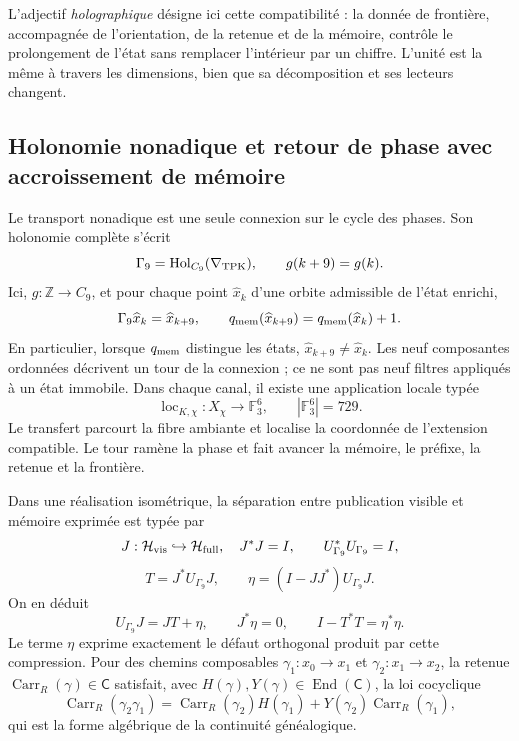 L'adjectif \emph{holographique} désigne ici cette compatibilité : la donnée de
frontière, accompagnée de l'orientation, de la retenue et de la mémoire, contrôle le
prolongement de l'état sans remplacer l'intérieur par un chiffre. L'unité est
la même à travers les dimensions, bien que sa décomposition et ses lecteurs
changent.

\subsection*{Holonomie nonadique et retour de phase avec accroissement de mémoire}

Le transport nonadique est une seule connexion sur le cycle des phases. Son
holonomie complète s'écrit
\begin{equation}\label{p12-83-c0-s1:eq:horizonte-conexion-nonadica}
 \Gamma_9=\operatorname{Hol}_{C_9}(\nabla_{\rm TPK}),
 \qquad g(k+9)=g(k).
\end{equation}
Ici, \(g:\mathbb Z\to C_9\), et pour chaque point
\(\widehat x_k\) d'une orbite admissible de l'état enrichi,
\[
 \Gamma_9\widehat x_k=\widehat x_{k+9},\qquad
 q_{\rm mem}(\widehat x_{k+9})
 =q_{\rm mem}(\widehat x_k)+1.
\]
En particulier, lorsque \(q_{\rm mem}\) distingue les états,
\(\widehat x_{k+9}\neq\widehat x_k\).
Les neuf composantes ordonnées décrivent un tour de la connexion ; ce ne sont pas
neuf filtres appliqués à un état immobile. Dans chaque canal, il existe une application
locale typée
\[
 \operatorname{loc}_{K,\chi}:X_\chi\longrightarrow\mathbb F_3^6,
 \qquad |\mathbb F_3^6|=729.
\]
Le transfert parcourt la fibre ambiante et localise la coordonnée de
l'extension compatible. Le tour ramène la phase et fait avancer la mémoire,
le préfixe, la retenue et la frontière.

Dans une réalisation isométrique, la séparation entre publication visible et
mémoire exprimée est typée par
\[
 J:\mathcal H_{\rm vis}\hookrightarrow\mathcal H_{\rm full},
 \quad J^*J=I,\qquad
 U_{\Gamma_9}^*U_{\Gamma_9}=I,
\]
\[
 T=J^*U_{\Gamma_9}J,\qquad
 \eta=(I-JJ^*)U_{\Gamma_9}J.
\]
On en déduit
\begin{equation}\label{p12-83-c0-s1:eq:horizonte-compresion-expresion}
 U_{\Gamma_9}J=JT+\eta,
 \qquad J^*\eta=0,
 \qquad I-T^*T=\eta^*\eta.
\end{equation}
Le terme \(\eta\) exprime exactement le défaut orthogonal produit par
cette compression. Pour des chemins composables
\(\gamma_1:x_0\to x_1\) et \(\gamma_2:x_1\to x_2\), la retenue
\(\operatorname{Carr}_R(\gamma)\in\mathsf C\) satisfait, avec
\(H(\gamma),Y(\gamma)\in\operatorname{End}(\mathsf C)\), la loi cocyclique
\begin{equation}\label{p12-83-c0-s1:eq:horizonte-carry-cociclico}
 \operatorname{Carr}_R(\gamma_2\gamma_1)
 =\operatorname{Carr}_R(\gamma_2)H(\gamma_1)
  +Y(\gamma_2)\operatorname{Carr}_R(\gamma_1),
\end{equation}
qui est la forme algébrique de la continuité généalogique.

